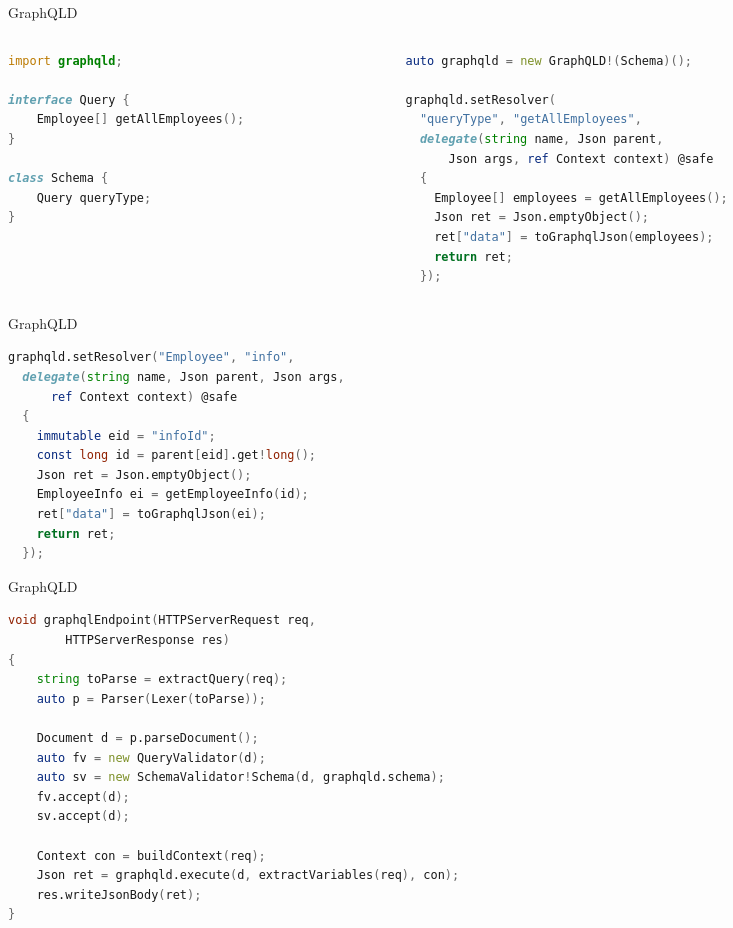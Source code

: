 \documentclass[aspectratio=169,notes]{beamer}
\begin{document}
	\begin{frame}[fragile]{GraphQLD}
		\begin{columns}[t]
			\begin{column}{0.4\textwidth}
\begin{lstlisting}[language=D,basicstyle=\scriptsize\ttfamily]
import graphqld;

interface Query {
	Employee[] getAllEmployees();
}

class Schema {
	Query queryType;
}
\end{lstlisting}
			\end{column}
	\pause
			\begin{column}{0.6\textwidth}
\begin{lstlisting}[language=D,basicstyle=\scriptsize\ttfamily]
auto graphqld = new GraphQLD!(Schema)();

graphqld.setResolver(
  "queryType", "getAllEmployees",
  delegate(string name, Json parent, 
      Json args, ref Context context) @safe
  {
    Employee[] employees = getAllEmployees();
    Json ret = Json.emptyObject();
    ret["data"] = toGraphqlJson(employees);
    return ret;
  });
\end{lstlisting}
			\end{column}
		\end{columns}
	\end{frame}

	\begin{frame}[fragile]{GraphQLD}
\begin{lstlisting}[language=D,basicstyle=\small\ttfamily]
graphqld.setResolver("Employee", "info",
  delegate(string name, Json parent, Json args,
      ref Context context) @safe
  {
    immutable eid = "infoId";
    const long id = parent[eid].get!long();
    Json ret = Json.emptyObject();
    EmployeeInfo ei = getEmployeeInfo(id);
    ret["data"] = toGraphqlJson(ei);
    return ret;
  });
\end{lstlisting}
	\end{frame}

	\begin{frame}[fragile]{GraphQLD}
\begin{lstlisting}[language=D,basicstyle=\small\ttfamily]
void graphqlEndpoint(HTTPServerRequest req, 
		HTTPServerResponse res) 
{
	string toParse = extractQuery(req);
	auto p = Parser(Lexer(toParse));

	Document d = p.parseDocument();
	auto fv = new QueryValidator(d);
	auto sv = new SchemaValidator!Schema(d, graphqld.schema);
	fv.accept(d);
	sv.accept(d);

	Context con = buildContext(req);
	Json ret = graphqld.execute(d, extractVariables(req), con);
	res.writeJsonBody(ret);
}
\end{lstlisting}
	\end{frame}
\end{document}
